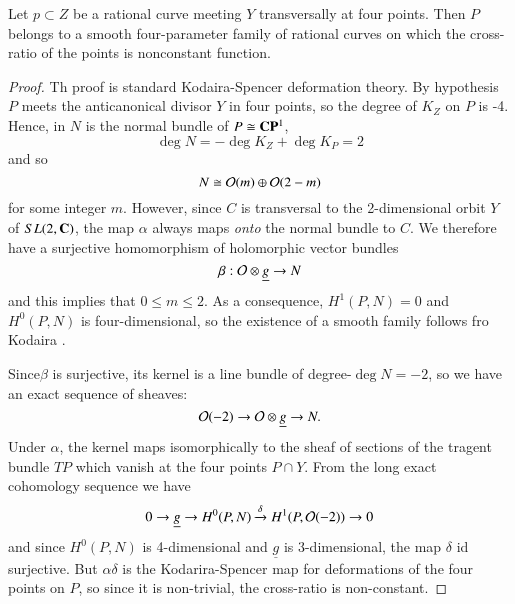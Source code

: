 \begin{proposition}\label{art7-proposition-3}
Let $p \subset Z$ be a rational curve meeting $Y$ transversally at four points. Then $P$ belongs to a smooth four-parameter family of rational curves on which the cross-ratio of the points is nonconstant function.
\end{proposition}

\begin{proof}
Th proof is standard Kodaira-Spencer deformation theory. By hypothesis $P$ meets the anticanonical divisor $Y$ in four points, so the degree of $K_{Z}$ on $P$ is -4. Hence, in $N$ is the normal bundle of $P \cong \mathbf{C}\mathbf{P}^{1}$,
$$
\deg N = -\deg K_{Z} + \deg K_{P} = 2
$$
and so
$$
N \cong \mathcal{O}(m) \oplus \mathcal{O}(2-m)
$$
for some integer $m$. However, since $C$ is transversal to the 2-dimensional orbit $Y$ of $SL(2, \mathbf{C})$, the map $\alpha$ always maps \textit{onto} the normal bundle to $C$. We therefore have a surjective homomorphism of holomorphic vector bundles
$$
\beta : \mathcal{O} \otimes \underline{g} \rightarrow N
$$
and this implies that $ 0 \leq m \leq  2$. As a consequence, $H^{1} (P ,N) = 0$ and $H^{0}(P, N)$ is four-dimensional, so the existence of a smooth family follows fro  Kodaira \cite{art7-key9}. 

Since\pageoriginale $\beta$ is surjective, its kernel is a line bundle of degree-$\deg N = -2$, so we have an exact sequence of sheaves:
$$
\mathcal{O}(-2)\rightarrow \mathcal{O} \otimes \underline{g}\rightarrow N.
$$
Under $\alpha$, the kernel maps isomorphically to the sheaf of sections of the tragent bundle $TP$ which vanish at the four points $P\cap Y$. From the long exact cohomology sequence we have
$$
0 \rightarrow \underline{g}\rightarrow H^{0}(P, N)\xrightarrow{\delta} H^{1}(P, \mathcal{O}(-2))\rightarrow 0
$$
and since $H^{0}(P, N)$ is 4-dimensional and $\underline{g}$ is 3-dimensional, the map $\delta$ id surjective. But $\alpha \delta$ is the Kodarira-Spencer map for deformations of the four points on $P$, so since it is non-trivial, the cross-ratio is non-constant.
\end{proof}

\medskip

